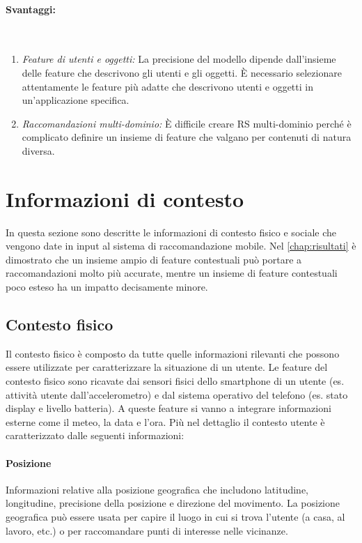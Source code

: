 \documentclass[12pt,italian]{report}
\newcommand{\myparagraph}[1]{\paragraph{#1}\mbox{}\\} %
\begin{document}
\myparagraph{Svantaggi:}
\begin{enumerate}
 \item \textit{Feature di utenti e oggetti:} La precisione del modello dipende dall'insieme delle feature che descrivono gli utenti e gli oggetti. \`E necessario selezionare attentamente le feature più adatte che descrivono utenti e oggetti in un'applicazione specifica.
  
 \item \textit{Raccomandazioni multi-dominio:} \`E difficile creare RS multi-dominio perché è complicato definire un insieme di feature che valgano per contenuti di natura diversa.
\end{enumerate}

\section{Informazioni di contesto} \label{sec:context-info}
In questa sezione sono descritte le informazioni di contesto fisico e sociale che vengono date in input al sistema di raccomandazione mobile. Nel \autoref{chap:risultati} è dimostrato che un insieme ampio di feature contestuali può portare a raccomandazioni molto più accurate, mentre un insieme di feature contestuali poco esteso ha un impatto decisamente minore.

\subsection{Contesto fisico}
Il contesto fisico è composto da tutte quelle informazioni rilevanti che possono essere utilizzate per caratterizzare la situazione di un utente. Le feature del contesto fisico sono ricavate dai sensori fisici dello smartphone di un utente (es. attività utente dall'accelerometro) e dal sistema operativo del telefono (es. stato display e livello batteria). A queste feature si vanno a integrare informazioni esterne come il meteo, la data e l'ora. Più nel dettaglio il contesto utente è caratterizzato dalle seguenti informazioni:

\paragraph{Posizione} Informazioni relative alla posizione geografica che includono latitudine, longitudine, precisione della posizione e direzione del movimento. La posizione geografica può essere usata per capire il luogo in cui si trova l'utente (a casa, al lavoro, etc.) o per raccomandare punti di interesse nelle vicinanze.
\end{document}

